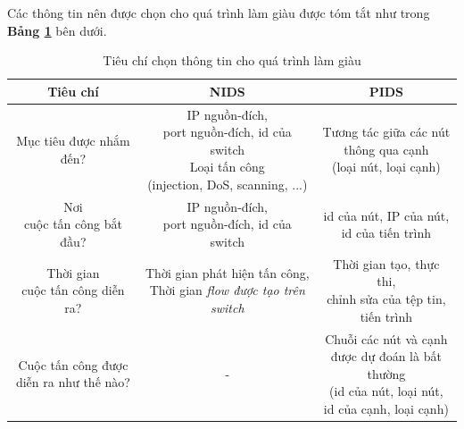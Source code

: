 







\bigbreak\noindent
Các thông tin nên được chọn cho quá trình làm giàu được tóm tắt như trong \textbf{Bảng \ref{tab:enrichment-criterion}} bên dưới.

\begin{table}[ht]
    \centering
    \caption{Tiêu chí chọn thông tin cho quá trình làm giàu}
    \label{tab:enrichment-criterion}
    \begin{adjustbox}{width=\textwidth}
    \begin{threeparttable}
    \begin{tabular}{|c|c|c|}
    \hline
    \textbf{Tiêu chí} & \textbf{NIDS} & \textbf{PIDS}\\
    \hline
    Mục tiêu được nhắm đến? & \makecell{IP nguồn-đích,\\port nguồn-đích, id của switch\\Loại tấn công\\(injection, DoS, scanning, ...)} & \makecell{Tương tác giữa các nút\\thông qua cạnh \\ (loại nút, loại cạnh)}  \\
    \hline
    \makecell{Nơi\\cuộc tấn công bắt đầu?} & \makecell{IP nguồn-đích,\\port nguồn-đích, id của switch} & \makecell{id của nút, IP của nút,\\id của tiến trình}\\
    \hline
    \makecell{Thời gian\\cuộc tấn công diễn ra?} & \makecell{Thời gian phát hiện tấn công,\\Thời gian \emph{flow được tạo trên switch}} & \makecell{Thời gian tạo, thực thi, \\  chỉnh sửa của tệp tin, \\ tiến trình} \\
    \hline
    \makecell{Cuộc tấn công được\\diễn ra như thế nào?} & - & \makecell{Chuỗi các nút và cạnh\\được dự đoán là bất thường\\(id của nút, loại nút,\\id của cạnh, loại cạnh)}\\
    \hline
    \end{tabular}
    \end{threeparttable}
    \end{adjustbox}
\end{table}

